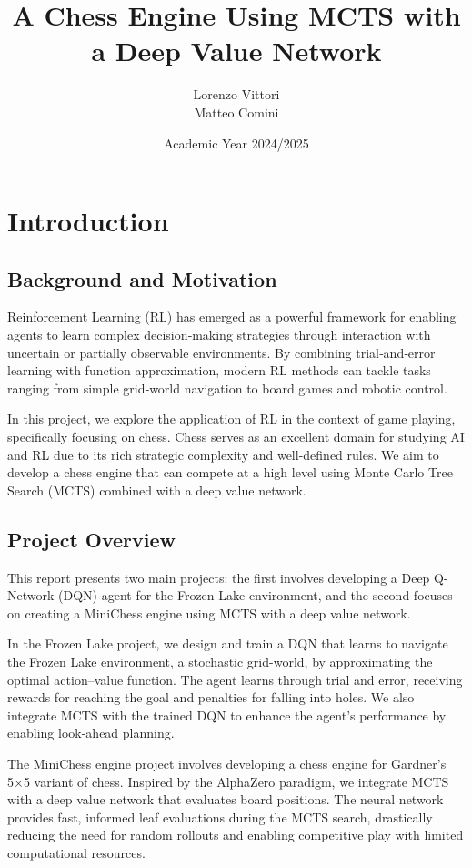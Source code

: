 \documentclass{report}
\begin{document}
\title{A Chess Engine Using MCTS with a Deep Value Network}
\author{Lorenzo Vittori \\ Matteo Comini}
\date{Academic Year 2024/2025}
\maketitle

\tableofcontents

\chapter{Introduction}
\section{Background and Motivation}
Reinforcement Learning (RL) has emerged as a powerful framework for enabling agents to learn complex decision‐making strategies through interaction with uncertain or partially observable environments. By combining trial‐and‐error learning with function approximation, modern RL methods can tackle tasks ranging from simple grid‐world navigation to board games and robotic control.

In this project, we explore the application of RL in the context of game playing, specifically focusing on chess. Chess serves as an excellent domain for studying AI and RL due to its rich strategic complexity and well-defined rules. We aim to develop a chess engine that can compete at a high level using Monte Carlo Tree Search (MCTS) combined with a deep value network.

\section{Project Overview}
This report presents two main projects: the first involves developing a Deep Q-Network (DQN) agent for the Frozen Lake environment, and the second focuses on creating a MiniChess engine using MCTS with a deep value network.

In the Frozen Lake project, we design and train a DQN that learns to navigate the Frozen Lake environment, a stochastic grid-world, by approximating the optimal action–value function. The agent learns through trial and error, receiving rewards for reaching the goal and penalties for falling into holes. We also integrate MCTS with the trained DQN to enhance the agent's performance by enabling look-ahead planning.

The MiniChess engine project involves developing a chess engine for Gardner’s 5×5 variant of chess. Inspired by the AlphaZero paradigm, we integrate MCTS with a deep value network that evaluates board positions. The neural network provides fast, informed leaf evaluations during the MCTS search, drastically reducing the need for random rollouts and enabling competitive play with limited computational resources.
\end{document}
